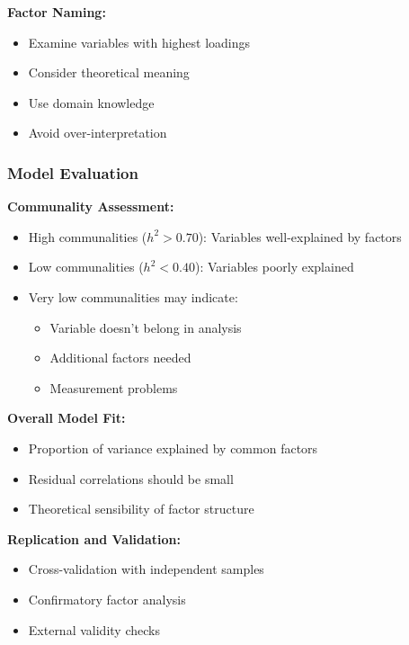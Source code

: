\documentclass[
]{article}
\begin{document}
\textbf{Factor Naming:}

\begin{itemize}
\item
  Examine variables with highest loadings
\item
  Consider theoretical meaning
\item
  Use domain knowledge
\item
  Avoid over-interpretation
\end{itemize}

\subsubsection{Model Evaluation}

\textbf{Communality Assessment:}

\begin{itemize}
\item
  High communalities (\(h^{2} > 0.70\)): Variables well-explained by
  factors
\item
  Low communalities (\(h^{2} < 0.40\)): Variables poorly explained
\item
  Very low communalities may indicate:

  \begin{itemize}
  \item
    Variable doesn't belong in analysis
  \item
    Additional factors needed
  \item
    Measurement problems
  \end{itemize}
\end{itemize}

\textbf{Overall Model Fit:}

\begin{itemize}
\item
  Proportion of variance explained by common factors
\item
  Residual correlations should be small
\item
  Theoretical sensibility of factor structure
\end{itemize}

\textbf{Replication and Validation:}

\begin{itemize}
\item
  Cross-validation with independent samples
\item
  Confirmatory factor analysis
\item
  External validity checks
\end{itemize}
\end{document}
